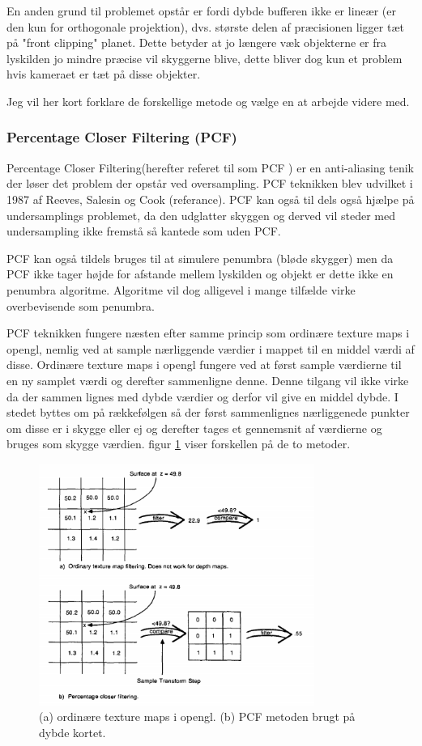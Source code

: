 \documentclass[11pt,a4paper]{article}
\begin{document}
En anden grund til problemet opstår er fordi dybde bufferen ikke er lineær (er den kun for orthogonale projektion), dvs. største delen af præcisionen ligger tæt på "front clipping" planet. Dette betyder at jo længere væk objekterne er fra lyskilden jo mindre præcise vil skyggerne blive, dette bliver dog kun et problem hvis kameraet er tæt på disse objekter. 


Jeg vil her kort forklare de forskellige metode og vælge en at arbejde videre med.

\subsubsection{Percentage Closer Filtering (PCF)}

Percentage Closer Filtering(herefter referet til som PCF ) er en anti-aliasing tenik der løser det problem der opstår ved oversampling. PCF teknikken blev udvilket i 1987 af Reeves, Salesin og Cook (referance). PCF kan også til dels også hjælpe på undersamplings problemet, da den udglatter skyggen og derved vil steder med undersampling ikke fremstå så kantede som uden PCF.

PCF kan også tildels bruges til at simulere penumbra (bløde skygger) men da PCF ikke tager højde for afstande mellem lyskilden og objekt er dette ikke en penumbra algoritme. Algoritme vil dog alligevel i mange tilfælde virke overbevisende som penumbra.

PCF teknikken fungere næsten efter samme princip som ordinære texture maps i opengl, nemlig ved at sample nærliggende værdier i mappet til en middel værdi af disse. Ordinære texture maps i opengl fungere ved at først sample værdierne til en ny samplet værdi og derefter sammenligne denne. Denne tilgang vil ikke virke da der sammen lignes med dybde værdier og derfor vil give en middel dybde. I stedet byttes om på rækkefølgen så  der først sammenlignes nærliggenede punkter om disse er i skygge eller ej og derefter tages et gennemsnit af værdierne og bruges som skygge værdien. figur \ref{P4} viser forskellen på de to metoder.

\begin{figure}[ht!]
\centering
\includegraphics[width=90mm]{img/PCF1.png}
\caption{(a) ordinære texture maps i opengl. (b) PCF metoden brugt på dybde kortet.}
\label{P4}
\end{figure}
\end{document}

